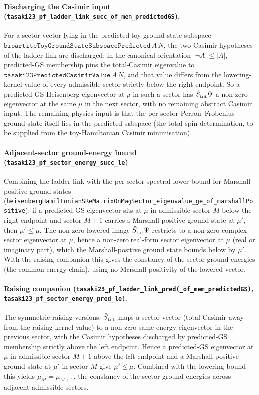 \documentclass[a4paper,11pt]{article}
\begin{document}
\paragraph{Discharging the Casimir input
(\texttt{tasaki23\_pf\_ladder\_link\_succ\_of\_mem\_predictedGS}).} For a
sector vector lying in the predicted toy ground-state subspace
$\mathtt{bipartiteToyGroundStateSubspacePredicted}\,A\,N$, the two Casimir
hypotheses of the ladder link are discharged: in the canonical orientation
$|\neg A|\le|A|$, predicted-GS membership pins the total-Casimir eigenvalue
to $\mathtt{tasaki23PredictedCasimirValue}\,A\,N$, and that value differs
from the lowering-kernel value of every admissible sector strictly below
the right endpoint. So a predicted-GS Heisenberg eigenvector at $\mu$ in
such a sector has $\hat S^-_{\rm tot}\Psi$ a non-zero eigenvector at the
same $\mu$ in the next sector, with no remaining abstract Casimir input.
The remaining physics input is that the per-sector Perron--Frobenius ground
state itself lies in the predicted subspace (the total-spin determination,
to be supplied from the toy-Hamiltonian Casimir minimisation).

\paragraph{Adjacent-sector ground-energy bound
(\texttt{tasaki23\_pf\_sector\_energy\_succ\_le}).} Combining the ladder
link with the per-sector spectral lower bound for Marshall-positive ground
states
(\texttt{heisenbergHamiltonianSReMatrixOnMagSector\_eigenvalue\_ge\_of\_marshallPositive}):
if a predicted-GS eigenvector sits at $\mu$ in admissible sector $M$ below
the right endpoint and sector $M+1$ carries a Marshall-positive ground
state at $\mu'$, then $\mu'\le\mu$. The non-zero lowered image
$\hat S^-_{\rm tot}\Psi$ restricts to a non-zero complex sector eigenvector
at $\mu$, hence a non-zero real-form sector eigenvector at $\mu$ (real or
imaginary part), which the Marshall-positive ground state bounds below by
$\mu'$. With the raising companion this gives the constancy of the sector
ground energies (the common-energy chain), using no Marshall positivity of
the lowered vector.

\paragraph{Raising companion
(\texttt{tasaki23\_pf\_ladder\_link\_pred(\_of\_mem\_predictedGS)},
\texttt{tasaki23\_pf\_sector\_energy\_pred\_le}).} The symmetric raising
versions: $\hat S^+_{\rm tot}$ maps a sector vector (total-Casimir away
from the raising-kernel value) to a non-zero same-energy eigenvector in the
previous sector, with the Casimir hypotheses discharged by predicted-GS
membership strictly above the left endpoint. Hence a predicted-GS
eigenvector at $\mu$ in admissible sector $M+1$ above the left endpoint and
a Marshall-positive ground state at $\mu'$ in sector $M$ give $\mu'\le\mu$.
Combined with the lowering bound this yields $\mu_M=\mu_{M+1}$, the
constancy of the sector ground energies across adjacent admissible sectors.
\end{document}
